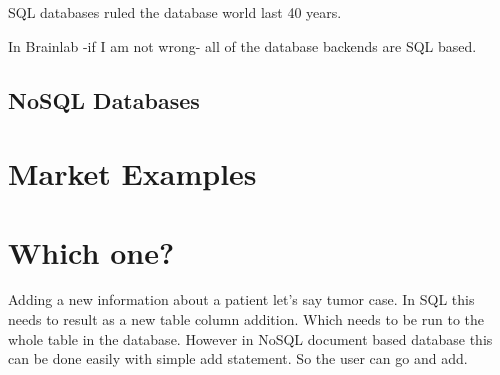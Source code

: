 \documentclass{article}
\begin{document}
SQL databases ruled the database world last 40 years. 

In Brainlab -if I am not wrong- all of the database backends are SQL based. 


\subsection{NoSQL Databases}


\section{Market Examples}

\section{Which one?}
Adding a new information about a patient let's say tumor case. In SQL this needs to result as a new table column addition. Which needs to be run to the whole table in the database. However in NoSQL document based database this can be done easily with simple add statement. So the user can go and add. 
\end{document}
